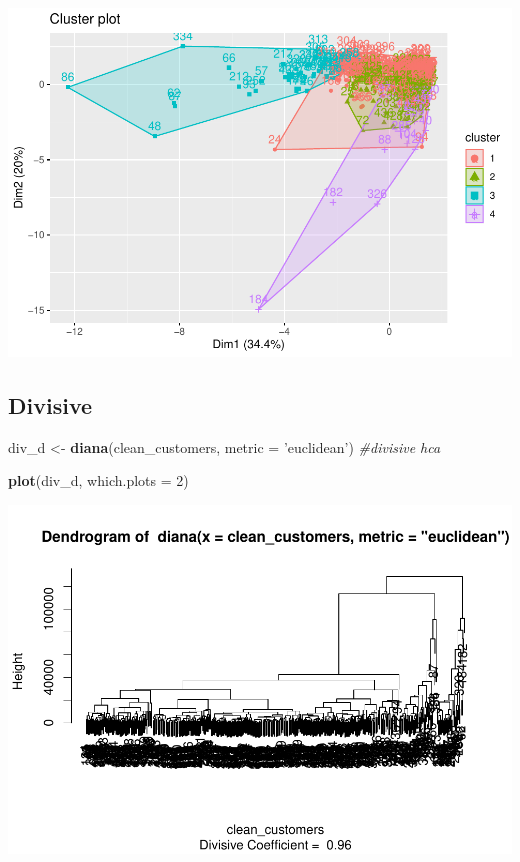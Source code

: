 \documentclass[
  english,
  man]{apa6}
\newenvironment{Shaded}{\begin{snugshade}}{\end{snugshade}}
\newcommand{\CommentTok}[1]{\textcolor[rgb]{0.56,0.35,0.01}{\textit{#1}}}
\newcommand{\DataTypeTok}[1]{\textcolor[rgb]{0.13,0.29,0.53}{#1}}
\newcommand{\DecValTok}[1]{\textcolor[rgb]{0.00,0.00,0.81}{#1}}
\newcommand{\KeywordTok}[1]{\textcolor[rgb]{0.13,0.29,0.53}{\textbf{#1}}}
\newcommand{\NormalTok}[1]{#1}
\newcommand{\StringTok}[1]{\textcolor[rgb]{0.31,0.60,0.02}{#1}}
\begin{document}
\includegraphics{MSDS680-Week-6-Kmeans-and-HCA_files/figure-latex/ward2 new height-2.pdf}

\hypertarget{divisive}{%
\subsection{Divisive}\label{divisive}}

\begin{Shaded}
\begin{Highlighting}[]
\NormalTok{div_d <-}\StringTok{ }\KeywordTok{diana}\NormalTok{(clean_customers, }\DataTypeTok{metric =} \StringTok{'euclidean'}\NormalTok{) }\CommentTok{#divisive hca}

\KeywordTok{plot}\NormalTok{(div_d, }\DataTypeTok{which.plots =} \DecValTok{2}\NormalTok{)}
\end{Highlighting}
\end{Shaded}

\includegraphics{MSDS680-Week-6-Kmeans-and-HCA_files/figure-latex/divisive-1.pdf}
\end{document}

